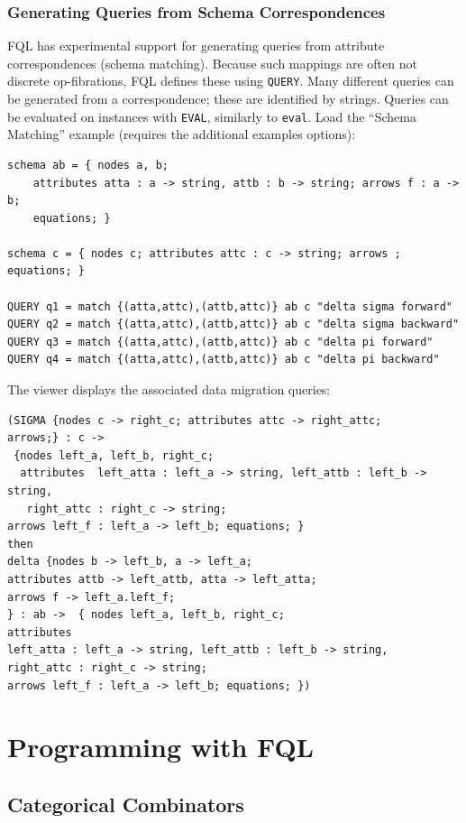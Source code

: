 \documentclass[12pt]{article}
\begin{document}
\subsubsection{Generating Queries from Schema Correspondences}

FQL has experimental support for generating queries from attribute correspondences (schema matching).  Because such mappings are often not discrete op-fibrations, FQL defines these using {\tt QUERY}.  Many different queries can be generated from a correspondence; these are identified by strings.  Queries can be evaluated on instances with {\tt EVAL}, similarly to {\tt eval}.  Load the ``Schema Matching'' example (requires the additional examples options):
\begin{verbatim}
schema ab = { nodes a, b;
	attributes atta : a -> string, attb : b -> string; arrows f : a -> b;
	equations; }

schema c = { nodes c; attributes attc : c -> string; arrows ; equations; }

QUERY q1 = match {(atta,attc),(attb,attc)} ab c "delta sigma forward"
QUERY q2 = match {(atta,attc),(attb,attc)} ab c "delta sigma backward"
QUERY q3 = match {(atta,attc),(attb,attc)} ab c "delta pi forward"
QUERY q4 = match {(atta,attc),(attb,attc)} ab c "delta pi backward"
\end{verbatim}
The viewer displays the associated data migration queries:
\begin{verbatim}
(SIGMA {nodes c -> right_c; attributes attc -> right_attc; 
arrows;} : c -> 
 {nodes left_a, left_b, right_c;
  attributes  left_atta : left_a -> string, left_attb : left_b -> string,
   right_attc : right_c -> string;
arrows left_f : left_a -> left_b; equations; } 
then 
delta {nodes b -> left_b, a -> left_a;
attributes attb -> left_attb, atta -> left_atta;
arrows f -> left_a.left_f;
} : ab ->  { nodes left_a, left_b, right_c;
attributes
left_atta : left_a -> string, left_attb : left_b -> string, 
right_attc : right_c -> string;
arrows left_f : left_a -> left_b; equations; })
\end{verbatim}




\section{Programming with FQL}

\subsection{Categorical Combinators}
\end{document}
